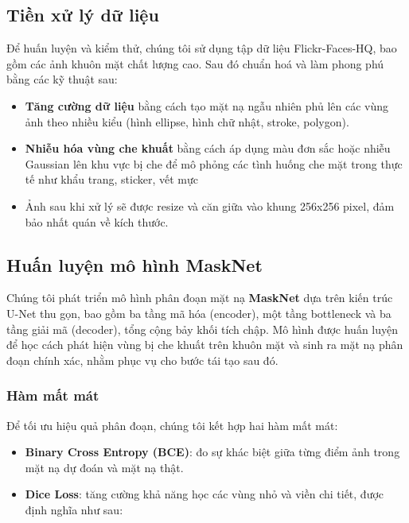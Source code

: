\documentclass[12pt,a4paper]{article}
\begin{document}
	\subsection{Tiền xử lý dữ liệu}
	Để huấn luyện và kiểm thử, chúng tôi sử dụng tập dữ liệu Flickr-Faces-HQ, bao gồm các ảnh khuôn mặt chất lượng cao. Sau đó chuẩn hoá và làm phong phú bằng các kỹ thuật sau:
	\begin{itemize}
		\item \textbf{Tăng cường dữ liệu} bằng cách tạo mặt nạ ngẫu nhiên phủ lên các vùng ảnh theo nhiều kiểu (hình ellipse, hình chữ nhật, stroke, polygon).
		
		\item \textbf{Nhiễu hóa vùng che khuất} bằng cách áp dụng màu đơn sắc hoặc nhiễu Gaussian lên khu vực bị che để mô phỏng các tình huống che mặt trong thực tế như khẩu trang, sticker, vết mực
		
		\item Ảnh sau khi xử lý sẽ được resize và căn giữa vào khung 256x256 pixel, đảm bảo nhất quán về kích thước.
	\end{itemize}
	
	\subsection{Huấn luyện mô hình MaskNet}
	
	Chúng tôi phát triển mô hình phân đoạn mặt nạ \textbf{MaskNet} dựa trên kiến trúc U-Net thu gọn, bao gồm ba tầng mã hóa (encoder), một tầng bottleneck và ba tầng giải mã (decoder), tổng cộng bảy khối tích chập. Mô hình được huấn luyện để học cách phát hiện vùng bị che khuất trên khuôn mặt và sinh ra mặt nạ phân đoạn chính xác, nhằm phục vụ cho bước tái tạo sau đó.
	
	\subsubsection*{Hàm mất mát}
	
	Để tối ưu hiệu quả phân đoạn, chúng tôi kết hợp hai hàm mất mát:
	
	\begin{itemize}
		\item \textbf{Binary Cross Entropy (BCE)}: đo sự khác biệt giữa từng điểm ảnh trong mặt nạ dự đoán và mặt nạ thật.
		\item \textbf{Dice Loss}: tăng cường khả năng học các vùng nhỏ và viền chi tiết, được định nghĩa như sau:
	\end{itemize}
	
\end{document}
